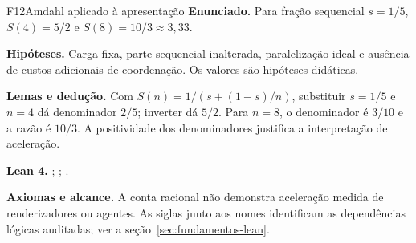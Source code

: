 \begin{formalizacao}{F12}{Amdahl aplicado à apresentação}
\textbf{Enunciado.} Para fração sequencial $s=1/5$, $S(4)=5/2$ e $S(8)=10/3\approx3{,}33$.

\textbf{Hipóteses.} Carga fixa, parte sequencial inalterada, paralelização ideal e ausência de custos adicionais de coordenação. Os valores são hipóteses didáticas.

\textbf{Lemas e dedução.} Com $S(n)=1/(s+(1-s)/n)$, substituir $s=1/5$ e $n=4$ dá denominador $2/5$; inverter dá $5/2$. Para $n=8$, o denominador é $3/10$ e a razão é $10/3$. A positividade dos denominadores justifica a interpretação de aceleração.

\textbf{Lean 4.} ; ; .

\textbf{Axiomas e alcance.} A conta racional não demonstra aceleração medida de renderizadores ou agentes. As siglas junto aos nomes identificam as dependências lógicas auditadas; ver a seção~\ref{sec:fundamentos-lean}.
\end{formalizacao}

